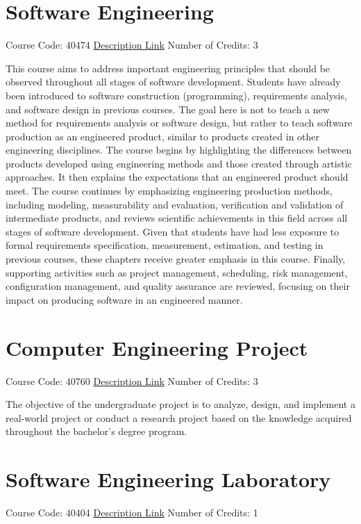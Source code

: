 \section{Software Engineering}
Course Code: 40474 \qquad \quad \href{https://docs.ce.sharif.edu/course/40474}{Description Link}
\qquad \quad Number of Credits: 3

This course aims to address important engineering principles that should be observed throughout all stages of software development. Students have already been introduced to software construction (programming), requirements analysis, and software design in previous courses. The goal here is not to teach a new method for requirements analysis or software design, but rather to teach software production as an engineered product, similar to products created in other engineering disciplines. The course begins by highlighting the differences between products developed using engineering methods and those created through artistic approaches. It then explains the expectations that an engineered product should meet. The course continues by emphasizing engineering production methods, including modeling, measurability and evaluation, verification and validation of intermediate products, and reviews scientific achievements in this field across all stages of software development. Given that students have had less exposure to formal requirements specification, measurement, estimation, and testing in previous courses, these chapters receive greater emphasis in this course. Finally, supporting activities such as project management, scheduling, risk management, configuration management, and quality assurance are reviewed, focusing on their impact on producing software in an engineered manner.

\section{Computer Engineering Project}
Course Code: 40760 \qquad \quad \href{https://docs.ce.sharif.edu/course/40760}{Description Link}
\qquad \quad Number of Credits: 3

The objective of the undergraduate project is to analyze, design, and implement a real-world project or conduct a research project based on the knowledge acquired throughout the bachelor's degree program.

\section{Software Engineering Laboratory}
Course Code: 40404 \qquad \quad \href{https://docs.ce.sharif.edu/course/40404}{Description Link}
\qquad \quad Number of Credits: 1

